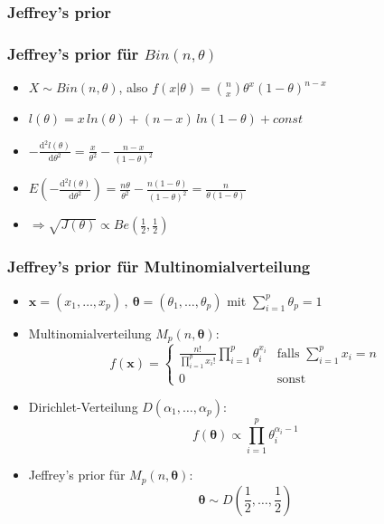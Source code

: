 \documentclass[aspectratio=169,xcolor=dvipsnames]{beamer}
\newtheorem{satz}{Satz}
\begin{document}
\begin{frame}
\frametitle{Jeffrey's prior}
\end{frame}

\begin{frame}
\frametitle{Jeffrey's prior für $Bin(n,\theta)$}
\begin{itemize}
	\item<1-> $X\sim Bin(n,\theta)$, also $f(x|\theta)= \binom{n}{x}\theta^x(1-\theta)^{n-x}$
	\item<2-> $l(\theta)=x\,ln(\theta)+(n-x)\,ln(1-\theta)+const$
	\item<3-> $-\frac{\text{d}^2l(\theta)}{\text{d}\theta^2}=\frac{x}{\theta^2}-\frac{n-x}{(1-\theta)^2}$ 
	\item<4-> $E(-\frac{\text{d}^2l(\theta)}{\text{d}\theta^2}) = \frac{n\theta}{\theta^2}-\frac{n(1-\theta)}{(1-\theta)^2}=\frac{n}{\theta(1-\theta)}$
	\item<5-> $\Rightarrow \sqrt{J(\theta)}\propto Be(\frac{1}{2},\frac{1}{2})$
\end{itemize}
\end{frame}

\begin{frame}
\frametitle{Jeffrey's prior für Multinomialverteilung}
\begin{itemize}
	\item<1-> $\boldsymbol{x}=(x_1,\dots,x_p)\,,~\boldsymbol{\theta}=(\theta_1,\dots,\theta_p)$ mit $\sum_{i=1}^p\theta_p = 1$
	\item<2-> Multinomialverteilung $M_p(n,\boldsymbol{\theta})$: $$f(\boldsymbol{x})=\left\{\begin{array}{ll}
	\frac{n!}{\prod_{i=1}^{p}x_i!}\prod_{i=1}^{p}\theta_i^{x_i} & \text{falls }\sum_{i=1}^{p}x_i=n\\
	0 & \text{sonst}
	\end{array}\right.$$
	\item<3-> Dirichlet-Verteilung $D(\alpha_1,\dots,\alpha_p)$: $$f(\boldsymbol{\theta})\propto\prod_{i=1}^{p}\theta_i^{\alpha_i-1}$$
	\item<4-> Jeffrey's prior für $M_p(n,\boldsymbol{\theta})$:
	$$\boldsymbol{\theta}\sim D\left(\frac{1}{2},\dots,\frac{1}{2}\right)$$
\end{itemize}
\end{frame}
\end{document}
